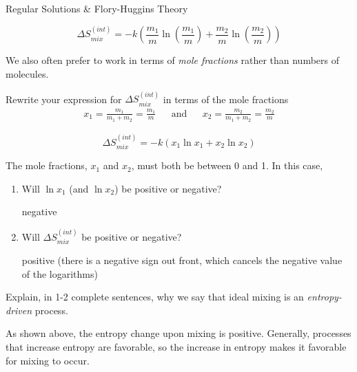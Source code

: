 \begin{activity}{Regular Solutions \& Flory-Huggins Theory}
\begin{ctqs}
\begin{solution}[1in]
				\begin{equation*}
					\Delta S_{mix}^{(int)} = -k\left(\frac{m_1}{m} \ln\left(\frac{m_1}{m}\right) + \frac{m_2}{m} \ln\left(\frac{m_2}{m}\right) \right)
				\end{equation*}
			\end{solution}
		
	\question We also often prefer to work in terms of \emph{mole fractions} rather than numbers of molecules. \label{ctq:Smixed}
	
		Rewrite your expression for $\Delta S_{mix}^{(int)}$ in terms of the mole fractions
		\begin{align*}
			x_1 = \frac{m_1}{m_1 + m_2} = \frac{m_1}{m} && \text{and} && x_2 = \frac{m_2}{m_1+m_2} = \frac{m_2}{m}
		\end{align*}
		
			\begin{solution}[0.75in]
			
				\begin{equation*}
					\Delta S_{mix}^{(int)} = -k\left(x_1 \ln x_1 + x_2 \ln x_2 \right)
				\end{equation*}
			\end{solution}
		
	\question The mole fractions, $x_1$ and $x_2$, must both be between 0 and 1.  In this case,
		\begin{enumerate}
			\item Will $\ln x_1$ (and $\ln x_2$) be positive or negative?
	
				\begin{solution}[1in]
					negative
				\end{solution}
				
			\item Will $\Delta S_{mix}^{(int)}$ be positive or negative? \label{ctq:Spositive}
	
				\begin{solution}[1in]
					positive (there is a negative sign out front, which cancels the negative value of the logarithms)
				\end{solution}
				
		\end{enumerate}
		
	\question Explain, in 1-2 complete sentences, why we say that ideal mixing is an \emph{entropy-driven} process.
	
		\begin{solution}[2.5in]
		
			As shown above, the entropy change upon mixing is positive.  Generally, processes that increase entropy are favorable, so the increase in entropy makes it favorable for mixing to occur.
			

\end{solution}
\end{ctqs}
\end{activity}
